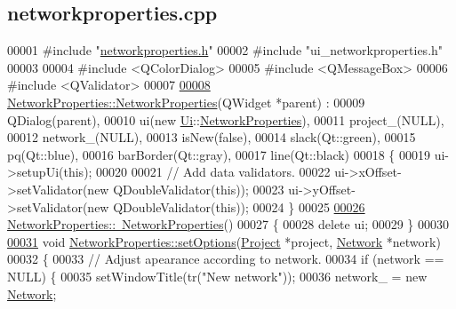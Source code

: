 \hypertarget{networkproperties_8cpp_source}{}\subsection{networkproperties.\+cpp}
\label{networkproperties_8cpp_source}

\begin{DoxyCode}
00001 \textcolor{preprocessor}{#include "\hyperlink{networkproperties_8h}{networkproperties.h}"}
00002 \textcolor{preprocessor}{#include "ui\_networkproperties.h"}
00003 
00004 \textcolor{preprocessor}{#include <QColorDialog>}
00005 \textcolor{preprocessor}{#include <QMessageBox>}
00006 \textcolor{preprocessor}{#include <QValidator>}
00007 
\hypertarget{networkproperties_8cpp_source_l00008}{}\hyperlink{class_network_properties_a3d9dac6454f6e722360d9d77af85e4ce}{00008} \hyperlink{class_network_properties_a3d9dac6454f6e722360d9d77af85e4ce}{NetworkProperties::NetworkProperties}(QWidget *parent) :
00009   QDialog(parent),
00010   ui(new \hyperlink{namespace_ui}{Ui}::\hyperlink{class_network_properties}{NetworkProperties}),
00011   project\_(NULL),
00012   network\_(NULL),
00013   isNew(false),
00014   slack(Qt::green),
00015   pq(Qt::blue),
00016   barBorder(Qt::gray),
00017   line(Qt::black)
00018 \{
00019   ui->setupUi(\textcolor{keyword}{this});
00020 
00021   \textcolor{comment}{// Add data validators.}
00022   ui->xOffset->setValidator(\textcolor{keyword}{new} QDoubleValidator(\textcolor{keyword}{this}));
00023   ui->yOffset->setValidator(\textcolor{keyword}{new} QDoubleValidator(\textcolor{keyword}{this}));
00024 \}
00025 
\hypertarget{networkproperties_8cpp_source_l00026}{}\hyperlink{class_network_properties_a097b617788eebe80236c0041f8293422}{00026} \hyperlink{class_network_properties_a097b617788eebe80236c0041f8293422}{NetworkProperties::~NetworkProperties}()
00027 \{
00028   \textcolor{keyword}{delete} ui;
00029 \}
00030 
\hypertarget{networkproperties_8cpp_source_l00031}{}\hyperlink{class_network_properties_a9dd17216f65e1c35012699e13547d984}{00031} \textcolor{keywordtype}{void} \hyperlink{class_network_properties_a9dd17216f65e1c35012699e13547d984}{NetworkProperties::setOptions}(\hyperlink{class_project}{Project} *project, 
      \hyperlink{class_network}{Network} *network)
00032 \{
00033 \textcolor{comment}{// Adjust apearance according to network.}
00034   \textcolor{keywordflow}{if} (network == NULL) \{
00035     setWindowTitle(tr(\textcolor{stringliteral}{"New network"}));
00036     network\_ = \textcolor{keyword}{new} \hyperlink{class_network}{Network};

\end{DoxyCode}
